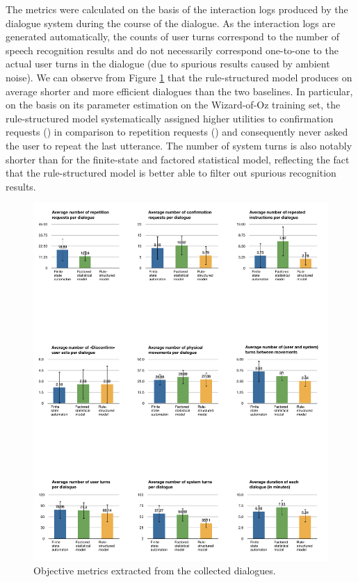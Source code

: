 The metrics were calculated on the basis of the interaction logs produced by the dialogue system during the course of the dialogue. As the interaction logs are generated automatically, the counts of user turns correspond to the number of speech recognition results and do not necessarily correspond one-to-one to the actual user turns in the dialogue (due to spurious results caused by ambient noise). We can observe from Figure \ref{fig:objective} that the rule-structured model produces on average shorter and more efficient dialogues than the two baselines.  In particular, on the basis on its parameter estimation on the Wizard-of-Oz training set, the rule-structured model systematically assigned higher utilities to confirmation requests () in comparison to repetition requests () and 
consequently never asked the user to repeat the last utterance. The number of system turns is also notably shorter than for the finite-state and factored statistical model, reflecting the fact that the rule-structured model is better able to filter out spurious recognition results. 

\begin{figure}[p]
\begin{center}
\includegraphics[scale=0.5]{imgs/objective.pdf}
\end{center} 
\caption{Objective metrics extracted from the collected dialogues. }
\label{fig:objective}
\end{figure}


